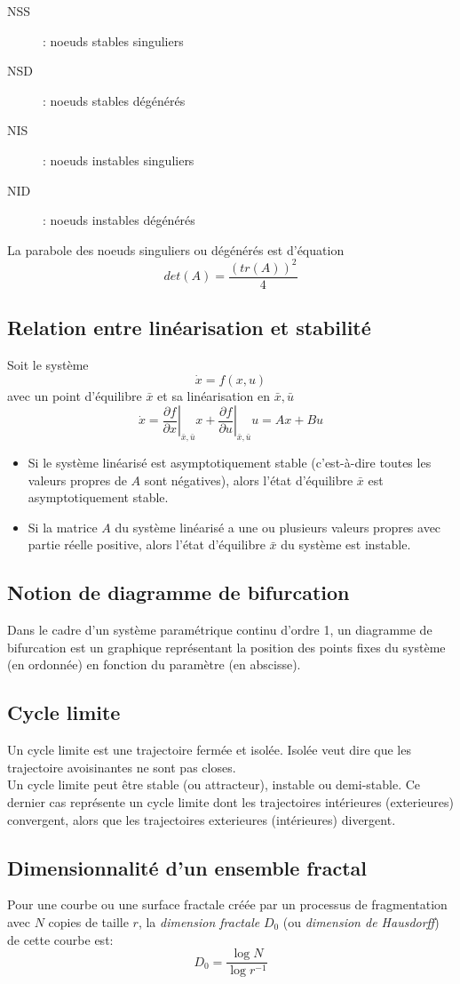 \documentclass[a4paper]{article}
\begin{document}
\begin{description}
	\item[NSS]: noeuds stables singuliers
	\item[NSD]: noeuds stables dégénérés
	\item[NIS]: noeuds instables singuliers
	\item[NID]: noeuds instables dégénérés
\end{description}
La parabole des noeuds singuliers ou dégénérés est d'équation
\[det(A)=\frac{(tr(A))^2}{4}\]
\subsection{Relation entre linéarisation et stabilité}
Soit le système
\[\dot x=f(x,u)\]
avec un point d'équilibre \(\bar x\) et sa linéarisation en \(\bar x,\bar u\)
\[
	\dot x=\left. \frac{\partial f}{\partial x}\right|_{\bar x,\bar u}x
	+\left. \frac{\partial f}{\partial u}\right|_{\bar x,\bar u}u
	=Ax+Bu
\]
\begin{itemize}
	\item Si le système linéarisé est asymptotiquement stable
		(c'est-à-dire toutes les valeurs propres de \(A\) sont négatives),
		alors l'état d'équilibre \(\bar x\) est asymptotiquement stable.
	\item Si la matrice \(A\) du système linéarisé a une ou plusieurs valeurs
	propres avec partie réelle positive, alors l'état d'équilibre \(\bar x\)
	du système est instable.
\end{itemize}
\subsection{Notion de diagramme de bifurcation}
Dans le cadre d'un système paramétrique continu d'ordre 1, un diagramme
de bifurcation est un graphique représentant la position des points fixes
du système (en ordonnée) en fonction du paramètre (en abscisse).
\subsection{Cycle limite}
Un cycle limite est une trajectoire fermée et isolée. Isolée veut dire
que les trajectoire avoisinantes ne sont pas closes.\\
Un cycle limite peut être stable (ou attracteur), instable ou demi-stable.
Ce dernier cas représente un cycle limite dont les trajectoires intérieures
(exterieures) convergent, alors que les trajectoires exterieures (intérieures)
divergent.
\subsection{Dimensionnalité d'un ensemble fractal}
Pour une courbe ou une surface fractale créée par un processus de
fragmentation avec \(N\) copies de taille \(r\), la \emph{dimension
fractale} \(D_0\) (ou \emph{dimension de Hausdorff}) de cette courbe est:
\[D_0=\frac{\log N}{\log r^{-1}}\]
\end{document}
